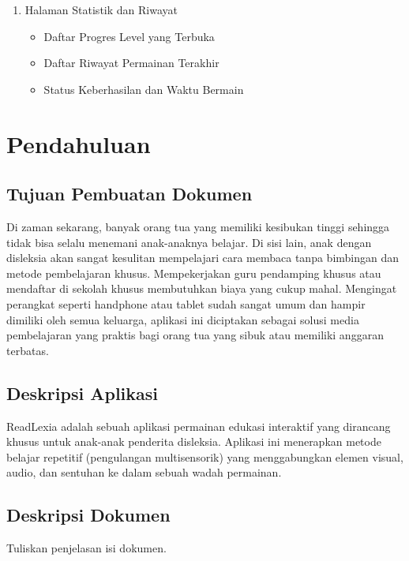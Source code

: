 \documentclass[12pt,a4paper]{report}
\begin{document}
\begin{enumerate}
\item Halaman Statistik dan Riwayat
    \begin{itemize}
    \item Daftar Progres Level yang Terbuka
    \item Daftar Riwayat Permainan Terakhir
    \item Status Keberhasilan dan Waktu Bermain
    \end{itemize}

\end{enumerate}


\tableofcontents
\newpage


\chapter{Pendahuluan}

\section{Tujuan Pembuatan Dokumen}
Di zaman sekarang, banyak orang tua yang memiliki kesibukan tinggi sehingga tidak bisa selalu menemani anak-anaknya belajar. Di sisi lain, anak dengan disleksia akan sangat kesulitan mempelajari cara membaca tanpa bimbingan dan metode pembelajaran khusus. Mempekerjakan guru pendamping khusus atau mendaftar di sekolah khusus membutuhkan biaya yang cukup mahal. Mengingat perangkat seperti handphone atau tablet sudah sangat umum dan hampir dimiliki oleh semua keluarga, aplikasi ini diciptakan sebagai solusi media pembelajaran yang praktis bagi orang tua yang sibuk atau memiliki anggaran terbatas.

\section{Deskripsi Aplikasi}
ReadLexia adalah sebuah aplikasi permainan edukasi interaktif yang dirancang khusus untuk anak-anak penderita disleksia. Aplikasi ini menerapkan metode belajar repetitif (pengulangan multisensorik) yang menggabungkan elemen visual, audio, dan sentuhan ke dalam sebuah wadah permainan.

\section{Deskripsi Dokumen}
Tuliskan penjelasan isi dokumen.
\end{document}
